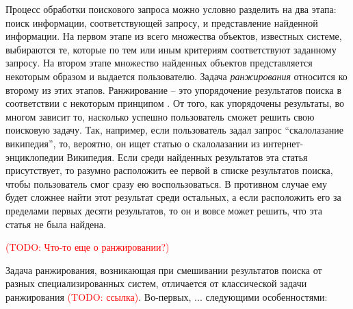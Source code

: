 \documentclass[12pt,a4paper]{report}
\newcommand\note[1]{\textcolor{red}{(#1)}}
\newcommand\todonote[1]{\note{TODO: #1}}
\begin{document}
Процесс обработки поискового запроса можно условно разделить на два этапа: поиск информации, соответствующей запросу, и представление найденной информации.
На первом этапе из всего множества объектов, известных системе, выбираются те, которые по тем или иным критериям соответствуют заданному запросу. На втором этапе множество найденных объектов представляется некоторым образом и выдается пользователю. 
Задача \emph{ранжирования} относится ко второму из этих этапов. Ранжирование -- это упорядочение результатов поиска в соответствии с некоторым принципом \cite{Ashmanov, LiuLR}. От того, как упорядочены результаты, во многом зависит то, насколько успешно пользователь сможет решить свою поисковую задачу. 
Так, например, если пользователь задал запрос ``скалолазание википедия'', то, вероятно, он ищет статью о скалолазании из интернет-энциклопедии Википедия. Если среди найденных результатов эта статья присутствует, то разумно расположить ее первой в списке результатов поиска, чтобы пользователь смог сразу ею воспользоваться. В противном случае ему будет сложнее найти этот результат среди остальных, а если расположить его за пределами первых десяти результатов, то он и вовсе может решить, что эта статья не была найдена.



\todonote{Что-то еще о ранжировании?}

Задача ранжирования, возникающая при смешивании результатов поиска от разных специализированных систем, отличается от классической задачи ранжирования \todonote{ссылка}. Во-первых, ... следующими особенностями:
\end{document}
